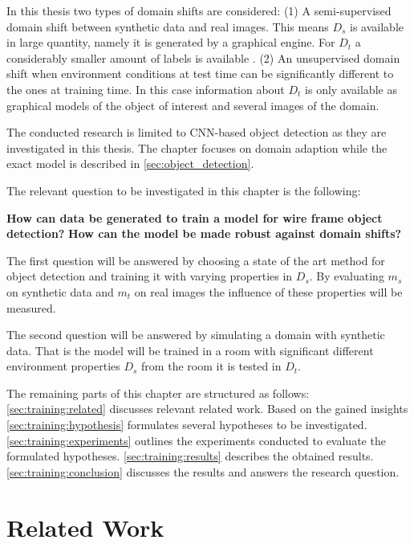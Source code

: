 In this thesis two types of domain shifts are considered: (1) A semi-supervised domain shift between synthetic data and real images. This means $D_s$ is available in large quantity, namely it is generated by a graphical engine. For $D_t$ a considerably smaller amount of labels is available . 
(2) An unsupervised domain shift when environment conditions at test time can be significantly different to the ones at training time. In this case information about $D_t$ is only available as graphical models of the object of interest and several images of the domain. 

The conducted research is limited to \ac{CNN}-based object detection as they are investigated in this thesis. The chapter focuses on domain adaption while the exact model is described in \autoref{sec:object_detection}.

The relevant question to be investigated in this chapter is the following:

\begin{center}
	\textbf{How can data be generated to train a model for wire frame object detection?}
	\textbf{How can the model be made robust against domain shifts?}
\end{center}

The first question will be answered by choosing a state of the art method for object detection and training it with varying properties in $D_s$. By evaluating $m_s$ on synthetic data and $m_t$ on real images the influence of these properties will be measured.  

The second question will be answered by simulating a domain with synthetic data. That is the model will be trained in a room with significant different environment properties $D_s$ from the room it is tested in $D_t$.

The remaining parts of this chapter are structured as follows: \autoref{sec:training:related} discusses relevant related work. Based on the gained insights \autoref{sec:training:hypothesis} formulates several hypotheses to be investigated. \autoref{sec:training:experiments} outlines the experiments conducted to evaluate the formulated hypotheses. \autoref{sec:training:results} describes the obtained results. \autoref{sec:training:conclusion} discusses the results and answers the research question.

\section{Related Work}
\label{sec:training:related}


